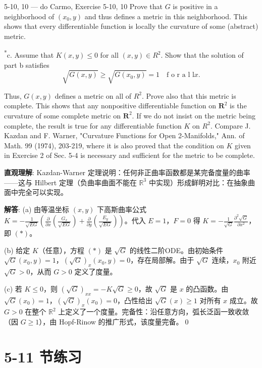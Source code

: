 \begin{Remark}
\begin{exercise}{5-10, 10 — do Carmo, Exercise 5-10, 10}
Prove that $G$ is positive in a neighborhood of $(x_0, y)$ and thus defines a metric in this neighborhood. This shows that every differentiable function is locally the curvature of some (abstract) metric.

\textsuperscript{*}c. Assume that $K(x,y)\leq 0$ for all $(x,y)\in R^2$. Show that the solution of part b satisfies
\[
\sqrt {G (x , y)} \geq \sqrt {G (x _ {0} , y)} = 1 \quad \text{f o r a l l} x.
\]

Thus, $G(x,y)$ defines a metric on all of $R^2$. Prove also that this metric is complete. This shows that any nonpositive differentiable function on $\mathbf{R}^2$ is the curvature of some complete metric on $\mathbf{R}^2$. If we do not insist on the metric being complete, the result is true for any differentiable function $K$ on $R^2$. Compare J. Kazdan and F. Warner, "Curvature Functions for Open 2-Manifolds," Ann. of Math. 99 (1974), 203-219, where it is also proved that the condition on $K$ given in Exercise 2 of Sec. 5-4 is necessary and sufficient for the metric to be complete.
\end{exercise}
\begin{solution}
\textbf{直观理解}: Kazdan-Warner 定理说明：任何非正曲率函数都是某完备度量的曲率——这与 Hilbert 定理（负曲率曲面不能在 $\mathbb{R}^3$ 中实现）形成鲜明对比：在抽象曲面中完全可以实现。

\textbf{解答}: (a) 由等温坐标 $(x,y)$ 下高斯曲率公式 $K=-\frac{1}{\sqrt{EG}}\left(\frac{\partial}{\partial x}\left(\frac{G_x}{\sqrt{EG}}\right)+\frac{\partial}{\partial y}\left(\frac{E_y}{\sqrt{EG}}\right)\right)$。代入 $E=1$，$F=0$ 得 $K=-\frac{1}{\sqrt{G}}\frac{\partial^2\sqrt{G}}{\partial x^2}$，即 $(*)$。

(b) 给定 $K$（任意），方程 $(*)$ 是 $\sqrt{G}$ 的线性二阶ODE。由初始条件 $\sqrt{G}(x_0,y)=1$，$(\sqrt{G})_x(x_0,y)=0$，存在局部解。由于 $\sqrt{G}$ 连续，$x_0$ 附近 $\sqrt{G}>0$，从而 $G>0$ 定义了度量。

(c) 若 $K\leq 0$，则 $(\sqrt{G})_{xx}=-K\sqrt{G}\geq 0$，故 $\sqrt{G}$ 是 $x$ 的凸函数。由 $\sqrt{G}(x_0)=1$，$(\sqrt{G})_x(x_0)=0$，凸性给出 $\sqrt{G}(x)\geq 1$ 对所有 $x$ 成立。故 $G>0$ 在整个 $\mathbb{R}^2$ 上定义了一个度量。完备性：沿任意方向，弧长泛函一致收敛（因 $G\geq 1$），由 Hopf-Rinow 的推广形式，该度量完备。\qed
\end{solution}

\section*{5-11 节练习}


\end{Remark}
